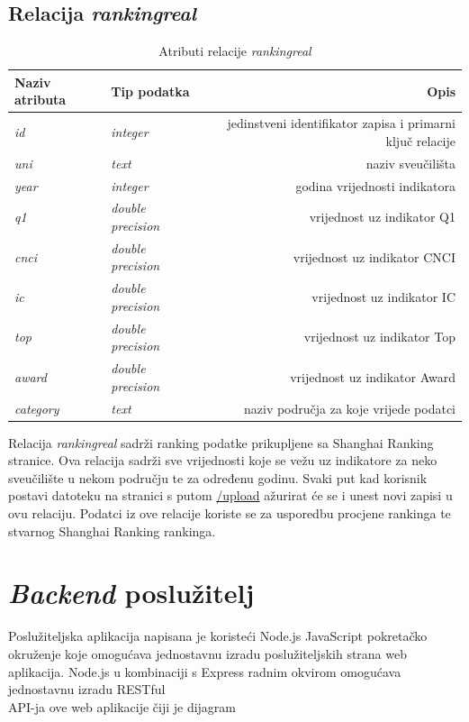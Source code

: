 \documentclass[times, utf8, zavrsni]{fer}
\begin{document}
\subsection{Relacija \emph{rankingreal}}
\begin{table}[htb]
    \caption{Atributi relacije \emph{rankingreal}}
        \label{tbl:rankingreal}
        \centering
        \begin{tabular}{llr} \hline
        Naziv atributa & Tip podatka & Opis\\ \hline
        \emph{id} &  \emph{integer} & jedinstveni identifikator zapisa i primarni ključ relacije\\
        \emph{uni} &  \emph{text} & naziv sveučilišta\\
        \emph{year} &  \emph{integer} & godina vrijednosti indikatora\\
        \emph{q1} &  \emph{double precision} & vrijednost uz indikator Q1\\
        \emph{cnci} &  \emph{double precision} & vrijednost uz indikator CNCI\\
        \emph{ic} &  \emph{double precision} & vrijednost uz indikator IC\\
        \emph{top} &  \emph{double precision} & vrijednost uz indikator Top\\
        \emph{award} &  \emph{double precision} & vrijednost uz indikator Award\\
        \emph{category} &  \emph{text} & naziv područja za koje vrijede podatci\\
        \end{tabular}
        \end{table}    
        \FloatBarrier 
Relacija \emph{rankingreal} sadrži ranking podatke prikupljene sa Shanghai Ranking stranice. Ova relacija sadrži sve 
vrijednosti koje se vežu uz indikatore za neko sveučilište u nekom području te za određenu godinu. Svaki put kad korisnik 
postavi datoteku na stranici s putom \url{/upload} ažurirat će se i unest novi zapisi u ovu relaciju. Podatci iz ove 
relacije koriste se za usporedbu procjene rankinga te stvarnog Shanghai Ranking rankinga.
\newpage\section{\emph{Backend} poslužitelj}
Poslužiteljska aplikacija napisana je koristeći Node.js JavaScript pokretačko okruženje koje omogućava jednostavnu izradu poslužiteljskih strana 
web aplikacija. Node.js u kombinaciji s Express radnim okvirom omogućava jednostavnu izradu RESTful \\API-ja ove web aplikacije čiji je dijagram 
\end{document}

